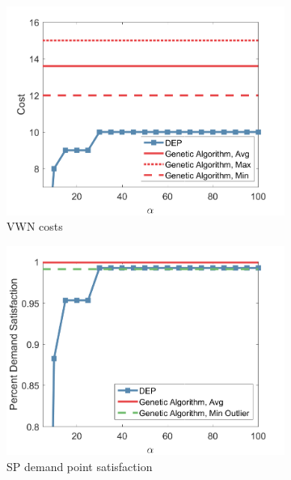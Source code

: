 \documentclass[conference]{IEEEtran}
\begin{document}
\begin{figure}[t]
\centering
\begin{subfigure}{.3\textwidth}
	\centering
	\includegraphics[width=1\linewidth]{Figures/ComparisonCost}
	\caption{VWN costs}
	\label{fig:VWNCompCost}
\end{subfigure}
\hspace{0.3cm}
\begin{subfigure}{.3\textwidth}
	\centering
	\includegraphics[width=1\linewidth]{Figures/ComparisonSatisfaction}
	\caption{SP demand point satisfaction}
	\label{fig:VWNCompSatis}
\end{subfigure}
\hspace{0.3cm}
\begin{subfigure}{.3\textwidth}

\end{subfigure}
\end{figure}
\end{document}

